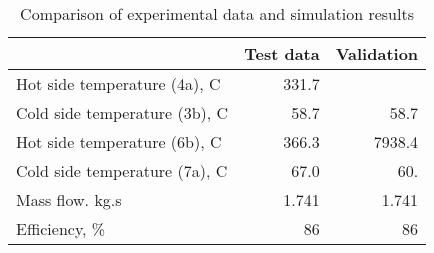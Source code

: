 \begin{table}
\label{tab:Comparison}
\caption{Comparison of experimental data and simulation results}
\begin{center}
\begin{tabulary}{0.9\textwidth}{LRR}
\toprule
& Test data \cite{Iverson_2013}  & Validation \\
\midrule
Hot side temperature (4a), C & 331.7 &  \\
Cold side temperature (3b), C & 58.7 & 58.7 \\
Hot side temperature (6b), C & 366.3 & 7938.4 \\
Cold side temperature (7a), C & 67.0 & 60. \\
Mass flow. kg.s & 1.741 & 1.741 \\
Efficiency, \% & 86 & 86 \\
\bottomrule
\end{tabulary}
\end{center}
\end{table}
